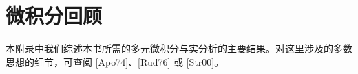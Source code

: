 \documentclass[../main.tex]{subfiles}
\begin{document}
\chapter{微积分回顾}\label{chapter:appC-calculus-review}

本附录中我们综述本书所需的多元微积分与实分析的主要结果。对这里涉及的多数思想的细节，可查阅 [Apo74]、[Rud76] 或 [Str00]。





\end{document}
